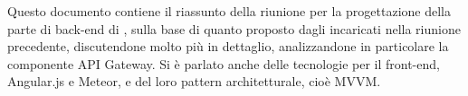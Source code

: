Questo documento contiene il riassunto della riunione per la progettazione della parte di back-end di \progetto, sulla base di quanto proposto dagli incaricati nella riunione precedente, discutendone molto più in dettaglio, analizzandone in particolare la componente API Gateway. Si è parlato anche delle tecnologie per il front-end, Angular.js e Meteor, e del loro pattern architetturale, cioè MVVM.
